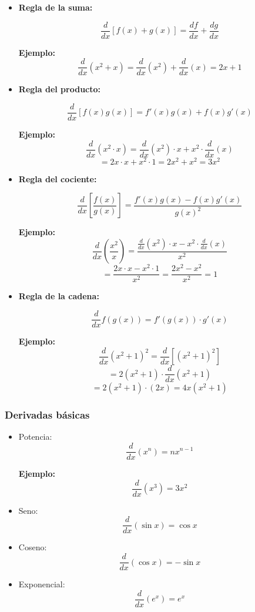 \begin{itemize}

\item \textbf{Regla de la suma:}

\[
\frac{d}{dx}[f(x) + g(x)] = \frac{df}{dx} + \frac{dg}{dx}
\]

\textbf{Ejemplo:}
\[
\frac{d}{dx}(x^2 + x) = \frac{d}{dx}(x^2) + \frac{d}{dx}(x) = 2x + 1
\]

\item \textbf{Regla del producto:}

\[
\frac{d}{dx}[f(x)g(x)] = f'(x)g(x) + f(x)g'(x)
\]

\textbf{Ejemplo:}
\[
\frac{d}{dx}(x^2 \cdot x) = \frac{d}{dx}(x^2)\cdot x + x^2 \cdot \frac{d}{dx}(x)
\]
\[
= 2x \cdot x + x^2 \cdot 1 = 2x^2 + x^2 = 3x^2
\]

\item \textbf{Regla del cociente:}

\[
\frac{d}{dx}\left[\frac{f(x)}{g(x)}\right] = \frac{f'(x)g(x) - f(x)g'(x)}{g(x)^2}
\]

\textbf{Ejemplo:}
\[
\frac{d}{dx}\left(\frac{x^2}{x}\right)
= \frac{\frac{d}{dx}(x^2)\cdot x - x^2 \cdot \frac{d}{dx}(x)}{x^2}
\]
\[
= \frac{2x \cdot x - x^2 \cdot 1}{x^2}
= \frac{2x^2 - x^2}{x^2} = 1
\]

\item \textbf{Regla de la cadena:}

\[
\frac{d}{dx}f(g(x)) = f'(g(x)) \cdot g'(x)
\]

\textbf{Ejemplo:}
\[
\frac{d}{dx}(x^2 + 1)^2 = \frac{d}{dx}\left[(x^2 + 1)^2\right]
\]
\[
= 2(x^2 + 1)\cdot \frac{d}{dx}(x^2 + 1)
\]
\[
= 2(x^2 + 1)\cdot (2x) = 4x(x^2 + 1)
\]

\end{itemize}

\subsubsection{Derivadas básicas}

\begin{itemize}

\item Potencia:
\[
\frac{d}{dx}(x^n) = nx^{n-1}
\]

\textbf{Ejemplo:}
\[
\frac{d}{dx}(x^3) = 3x^2
\]

\item Seno:
\[
\frac{d}{dx}(\sin x) = \cos x
\]

\item Coseno:
\[
\frac{d}{dx}(\cos x) = -\sin x
\]

\item Exponencial:
\[
\frac{d}{dx}(e^x) = e^x
\]

\end{itemize}

